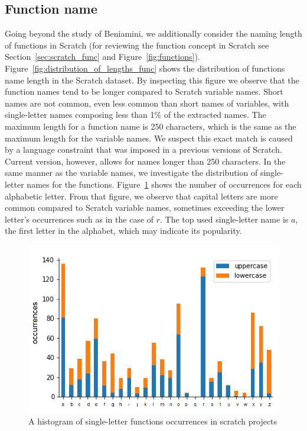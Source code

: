 \documentclass[conference]{IEEEtran}
\begin{document}
\subsection {Function name}
Going beyond the study of Beniamini, we additionally consider the naming length of functions in Scratch (for reviewing the function concept in Scratch see Section~\ref{sec:scratch_func} and Figure~\ref{fig:functions}).  Figure~\ref{fig:distribution_of_lengths_func} shows the distribution of functions name length in the Scratch dataset. By inspecting this figure we observe that the function names tend to be longer compared to Scratch variable names. Short names are not common, even less common than short names of variables, with single-letter names composing less than 1\% of the extracted names. The maximum length for a function name is 250 characters, which is the same as the maximum length for the variable names. We suspect this exact match is caused by a language constraint that was imposed in a previous versions of Scratch. Current version, however, allows for names longer than 250 characters. 
In the same manner as the variable names, we investigate the distribution of single-letter names for the functions. Figure~\ref{fig:one_letter_occurrence_functions} shows the number of occurrences for each alphabetic letter. From that figure, we observe that capital letters are more common compared to Scratch variable names, sometimes exceeding the lower letter's occurrences such as in the case of $r$. The top used single-letter name is $a$, the first letter in the alphabet, which may indicate its popularity.


\begin{figure}[h]
	\begin{center}
		\includegraphics[width=\columnwidth]{fig/funcname_singleletter-occurrences}
		\caption{A histogram of single-letter functions occurrences in scratch projects}
		\label{fig:one_letter_occurrence_functions}
	\end{center}
\end{figure} 
\end{document}
